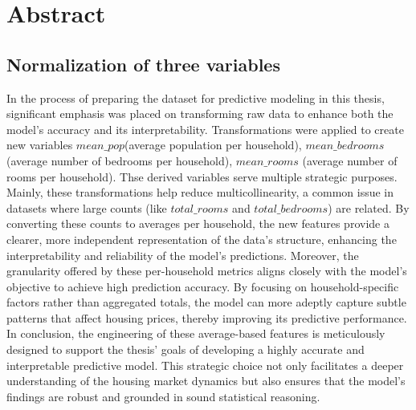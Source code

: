 \documentclass[12pt]{article}
\begin{document}
\section{Abstract}
\subsection{Normalization of three variables}
In the process of preparing the dataset for predictive modeling in this thesis, significant emphasis was placed on transforming raw data to enhance both the model's accuracy and its interpretability. Transformations were applied to create new variables $mean\_pop$(average population per household), $mean\_bedrooms$ (average number of bedrooms per household), $mean\_rooms$ (average number of rooms per household). Thse derived variables serve multiple strategic purposes. Mainly, these transformations help reduce multicollinearity, a common issue in datasets where large counts (like $total\_rooms$ and $total\_bedrooms$) are related. By converting these counts to averages per household, the new features provide a clearer, more independent representation of the data's structure, enhancing the interpretability and reliability of the model's predictions. Moreover, the granularity offered by these per-household metrics aligns closely with the model's objective to achieve high prediction accuracy. By focusing on household-specific factors rather than aggregated totals, the model can more adeptly capture subtle patterns that affect housing prices, thereby improving its predictive performance.
In conclusion, the engineering of these average-based features is meticulously designed to support the thesis' goals of developing a highly accurate and interpretable predictive model. This strategic choice not only facilitates a deeper understanding of the housing market dynamics but also ensures that the model's findings are robust and grounded in sound statistical reasoning.
\end{document}
